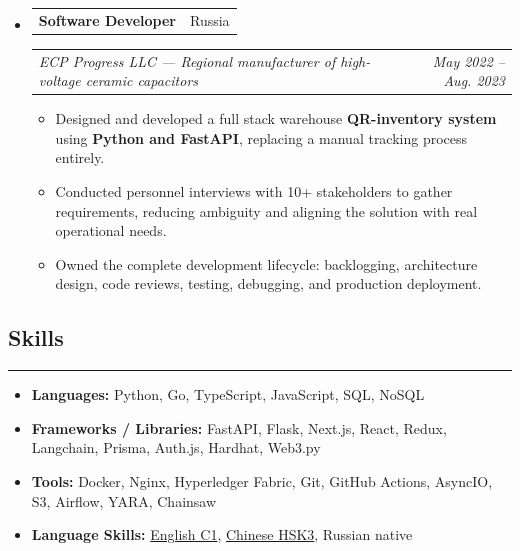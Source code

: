 \documentclass[11pt,letterpaper]{article}
\makeatletter
\newcommand{\headerrow}[2]
{\begin{tabular*}{\linewidth}{l@{\extracolsep{\fill}}r}
#1 & #2 \\
\end{tabular*}}
\makeatother
\begin{document}
\begin{itemize}[leftmargin=0em, itemsep=0.6em]
    \item
    \headerrow
        {\textbf{Software Developer}}
        {Russia}
    \headerrow
        {\emph{ECP Progress LLC --- Regional manufacturer of high-voltage ceramic capacitors}}
        {\emph{May 2022 -- Aug. 2023}}
    \begin{itemize}[leftmargin=1.2em, itemsep=0.1em]
        \renewcommand\labelitemi{$\bullet$}
        \item Designed and developed a full stack warehouse \textbf{QR-inventory system} using
              \textbf{Python and FastAPI}, replacing a manual tracking process entirely.
        \item Conducted personnel interviews with 10+ stakeholders to gather requirements,
              reducing ambiguity and aligning the solution with real operational needs.
        \item Owned the complete development lifecycle: backlogging, architecture design,
              code reviews, testing, debugging, and production deployment.
    \end{itemize}

\end{itemize}

\vspace{0.2cm}

\subsection*{\Large Skills}
\vspace{-0.5em}
\hrule
\vspace{0.3em}

\begin{itemize}[leftmargin=0em, noitemsep]
    \renewcommand\labelitemi{}
    \item \textbf{Languages:} Python, Go, TypeScript, JavaScript, SQL, NoSQL
    \item \textbf{Frameworks / Libraries:} FastAPI, Flask, Next.js, React, Redux, Langchain, Prisma, Auth.js, Hardhat, Web3.py
    \item \textbf{Tools:} Docker, Nginx, Hyperledger Fabric, Git, GitHub Actions, AsyncIO, S3, Airflow, YARA, Chainsaw
    \item \textbf{Language Skills:}
    \href{https://iasenovets.github.io/files/toefl_8cd5f4a2b8ec8f34da49ea0faeef43f1.pdf}{English C1},
    \href{https://admin.chinesetest.cn/queryScore.do?sid=c2tActR9Wb%2704b861aefbdc5e9fd0b44afa717d08cbceb0720e582ce25f%2724d7sWsQ5nVUQSwD}{Chinese HSK3},
    Russian native
\end{itemize}
\end{document}
